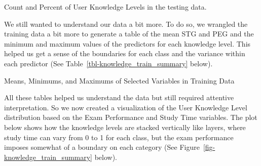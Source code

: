 \documentclass[
  letterpaper,
  DIV=11,
  numbers=noendperiod]{scrartcl}
\begin{document}
\begin{table}

\caption{\label{tbl-know_percentage_test}Count and Percent of User
Knowledge Levels in the testing data.}


\end{table}%

We still wanted to understand our data a bit more. To do so, we wrangled
the training data a bit more to generate a table of the mean STG and PEG
and the minimum and maximum values of the predictors for each knowledge
level. This helped us get a sense of the boundaries for each class and
the variance within each predictor (See
Table~\ref{tbl-knowledge_train_summary} below).

\begin{table}

\caption{\label{tbl-knowledge_train_summary}Means, Minimums, and
Maximums of Selected Variables in Training Data}


\end{table}%

All these tables helped us understand the data but still required
attentive interpretation. So we now created a visualization of the User
Knowledge Level distribution based on the Exam Performance and Study
Time variables. The plot below shows how the knowledge levels are
stacked vertically like layers, where study time can vary from 0 to 1
for each class, but the exam performance imposes somewhat of a boundary
on each category (See Figure~\ref{fig-knowledge_train_summary} below).
\end{document}
